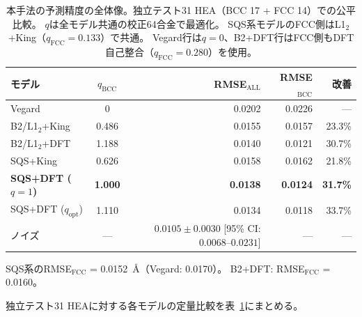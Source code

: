 \documentclass[5p,10pt]{elsarticle}
\begin{document}
\begin{table}[H]
\centering
\caption{本手法の予測精度の全体像。独立テスト31 HEA（BCC 17 + FCC 14）での公平比較。
$q$は全モデル共通の校正64合金で最適化。
SQS系モデルのFCC側はL1$_2$+King（$q_\text{FCC} = 0.133$）で共通。
Vegard行は$q=0$、B2+DFT行はFCC側もDFT自己整合（$q_\text{FCC} = 0.280$）を使用。}
\label{tab:conclusion_summary}
\scriptsize
\begin{tabular}{@{}lcrrr@{}}
\toprule
モデル & $q_\text{BCC}$ & RMSE$_\text{ALL}$ & RMSE$_\text{BCC}$ & 改善 \\
\midrule
Vegard & 0 & 0.0202 & 0.0226 & --- \\
B2/L1$_2$+King & 0.486 & 0.0155 & 0.0157 & 23.3\% \\
B2/L1$_2$+DFT & 1.188 & 0.0140 & 0.0121 & 30.7\% \\
SQS+King & 0.626 & 0.0158 & 0.0162 & 21.8\% \\
\textbf{SQS+DFT ($q\!=\!1$)} & \textbf{1.000} & \textbf{0.0138} & \textbf{0.0124} & \textbf{31.7\%} \\
SQS+DFT ($q_\text{opt}$) & 1.110 & 0.0134 & 0.0118 & 33.7\% \\
\midrule
ノイズ & --- & $0.0105 \pm 0.0030$ [95\% CI: $0.0068$--$0.0231$] & --- & --- \\
\bottomrule
\end{tabular}
\par\smallskip
{\scriptsize SQS系のRMSE$_\text{FCC}$ = 0.0152~\AA{}（Vegard: 0.0170）。
B2+DFT: RMSE$_\text{FCC}$ = 0.0160。}
\end{table}

独立テスト31 HEAに対する各モデルの定量比較を表~\ref{tab:conclusion_summary}にまとめる。
\end{document}

